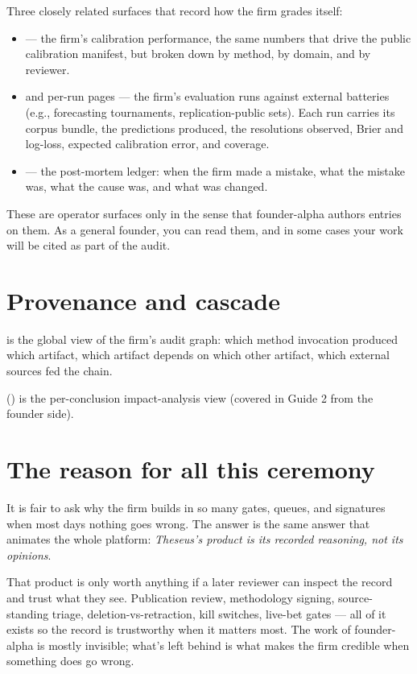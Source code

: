 \documentclass[11pt]{article}
\begin{document}
Three closely related surfaces that record how the firm grades itself:

\begin{itemize}[leftmargin=*,itemsep=0.2em]
  \item {} --- the firm's calibration performance, the
        same numbers that drive the public calibration manifest, but
        broken down by method, by domain, and by reviewer.
  \item {} and per-run pages --- the firm's evaluation runs
        against external batteries (e.g., forecasting tournaments,
        replication-public sets). Each run carries its corpus bundle,
        the predictions produced, the resolutions observed, Brier
        and log-loss, expected calibration error, and coverage.
  \item {} --- the post-mortem ledger: when the firm
        made a mistake, what the mistake was, what the cause was, and
        what was changed.
\end{itemize}

These are operator surfaces only in the sense that founder-alpha
authors entries on them. As a general founder, you can read them, and
in some cases your work will be cited as part of the audit.

\section{Provenance and cascade}

 is the global view of the firm's audit graph: which
method invocation produced which artifact, which artifact depends on
which other artifact, which external sources fed the chain.

 () is the per-conclusion
impact-analysis view (covered in Guide 2 from the founder side).

\section{The reason for all this ceremony}

It is fair to ask why the firm builds in so many gates, queues, and
signatures when most days nothing goes wrong. The answer is the same
answer that animates the whole platform: \emph{Theseus's product is
its recorded reasoning, not its opinions}.

That product is only worth anything if a later reviewer can inspect
the record and trust what they see. Publication review, methodology
signing, source-standing triage, deletion-vs-retraction, kill
switches, live-bet gates --- all of it exists so the record is
trustworthy when it matters most. The work of founder-alpha is
mostly invisible; what's left behind is what makes the firm credible
when something does go wrong.
\end{document}
